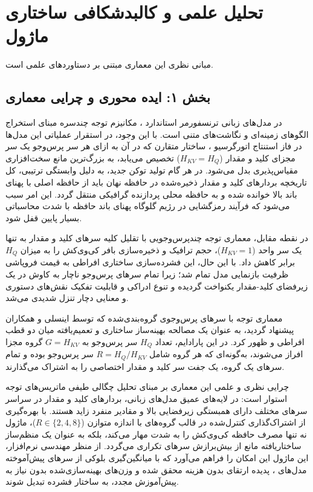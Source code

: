 \section{تحلیل علمی و کالبدشکافی ساختاری ماژول }

مبانی نظری این معماری مبتنی بر دستاوردهای علمی \cite{ainslie2023gqa} است.
\label{sec:gqa_attention}

\subsection*{بخش ۱: ایده محوری و چرایی معماری }
در مدل‌های زبانی ترنسفورمر استاندارد ، مکانیزم توجه چندسره  مبنای استخراج الگوهای زمینه‌ای و نگاشت‌های متنی است. با این وجود، در استقرار عملیاتی این مدل‌ها در فاز استنتاج اتورگرسیو ، ساختار متقارن  که در آن به ازای هر سر پرس‌وجو یک سر مجزای کلید و مقدار ($H_{KV} = H_Q$) تخصیص می‌یابد، به بزرگ‌ترین مانع سخت‌افزاری مقیاس‌پذیری بدل می‌شود. در هر گام تولید توکن جدید، به دلیل وابستگی ترتیبی، کل تاریخچه بردارهای کلید و مقدار ذخیره‌شده در حافظه نهان  باید از حافظه اصلی با پهنای باند بالا  خوانده شده و به حافظه محلی پردازنده گرافیکی منتقل گردد. این امر سبب می‌شود که فرآیند رمزگشایی در رژیم گلوگاه پهنای باند حافظه  با شدت محاسباتی بسیار پایین قفل شود.

در نقطه مقابل، معماری توجه چندپرس‌وجویی  با تقلیل کلیه سرهای کلید و مقدار به تنها یک سر واحد ($H_{KV} = 1$)، حجم ترافیک و ذخیره‌سازی بافر کی‌وی‌کش را به میزان $H_Q$ برابر کاهش داد. با این حال، این فشرده‌سازی ساختاری افراطی به قیمت فروپاشی ظرفیت بازنمایی مدل تمام شد؛ زیرا تمام سرهای پرس‌وجو ناچار به کاوش در یک زیرفضای کلید-مقدار یکنواخت گردیده و تنوع ادراکی و قابلیت تفکیک نقش‌های دستوری و معنایی دچار تنزل شدیدی می‌شد.

معماری توجه با سرهای پرس‌وجوی گروه‌بندی‌شده  که توسط اینسلی و همکاران  پیشنهاد گردید، به عنوان یک مصالحه بهینه‌ساز ساختاری و تعمیم‌یافته میان دو قطب افراطی  و  ظهور کرد. در این پارادایم، تعداد $H_Q$ سر پرس‌وجو به $G = H_{KV}$ گروه مجزا افراز می‌شوند، به‌گونه‌ای که هر گروه شامل $R = H_Q / H_{KV}$ سر پرس‌وجو بوده و تمام سرهای یک گروه، یک جفت سر کلید و مقدار اختصاصی را به اشتراک می‌گذارند. 

چرایی نظری و علمی این معماری بر مبنای تحلیل چگالی طیفی ماتریس‌های توجه استوار است: در لایه‌های عمیق مدل‌های زبانی، بردارهای کلید و مقدار در سراسر سرهای مختلف دارای همبستگی زیرفضایی بالا و مقادیر منفرد زاید هستند. با بهره‌گیری از اشتراک‌گذاری کنترل‌شده در قالب گروه‌های با اندازه متوازن ($R \in \{2, 4, 8\}$)، ماژول  نه تنها مصرف حافظه کی‌وی‌کش را به شدت مهار می‌کند، بلکه به عنوان یک منظم‌ساز ساختاریافته  مانع از بیش‌برازش سرهای تکراری می‌گردد. از منظر مهندسی نرم‌افزار، این ماژول این امکان را فراهم می‌آورد که با میانگین‌گیری بلوکی از سرهای پیش‌آموخته مدل‌های ، پدیده ارتقای بدون هزینه  محقق شده و وزن‌های بهینه‌سازی‌شده بدون نیاز به پیش‌آموزش مجدد، به ساختار فشرده تبدیل شوند.

